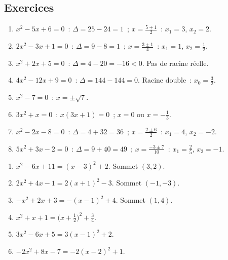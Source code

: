 
\subsection*{Exercices}


\begin{enumerate}
  \item $x^2-5x+6=0$~: $\Delta=25-24=1$~; $x=\frac{5\pm1}{2}$~: $x_1=3$, $x_2=2$.
  \item $2x^2-3x+1=0$~: $\Delta=9-8=1$~; $x=\frac{3\pm1}{4}$~: $x_1=1$, $x_2=\frac{1}{2}$.
  \item $x^2+2x+5=0$~: $\Delta=4-20=-16<0$. Pas de racine r\'eelle.
  \item $4x^2-12x+9=0$~: $\Delta=144-144=0$. Racine double~: $x_0=\frac{3}{2}$.
  \item $x^2-7=0$~: $x=\pm\sqrt{7}$.
  \item $3x^2+x=0$~: $x(3x+1)=0$~; $x=0$ ou $x=-\frac{1}{3}$.
  \item $x^2-2x-8=0$~: $\Delta=4+32=36$~; $x=\frac{2\pm6}{2}$~: $x_1=4$, $x_2=-2$.
  \item $5x^2+3x-2=0$~: $\Delta=9+40=49$~; $x=\frac{-3\pm7}{10}$~: $x_1=\frac{2}{5}$, $x_2=-1$.
\end{enumerate}


\begin{enumerate}
  \item $x^2-6x+11=(x-3)^2+2$. Sommet $(3,2)$.
  \item $2x^2+4x-1=2(x+1)^2-3$. Sommet $(-1,-3)$.
  \item $-x^2+2x+3=-(x-1)^2+4$. Sommet $(1,4)$.
  \item $x^2+x+1=\bigl(x+\tfrac{1}{2}\bigr)^2+\tfrac{3}{4}$.
  \item $3x^2-6x+5=3(x-1)^2+2$.
  \item $-2x^2+8x-7=-2(x-2)^2+1$.
\end{enumerate}


